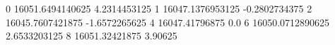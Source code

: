 0 16051.6494140625 4.2314453125
1 16047.1376953125 -0.2802734375
2 16045.7607421875 -1.6572265625
4 16047.41796875 0.0
6 16050.0712890625 2.6533203125
8 16051.32421875 3.90625
